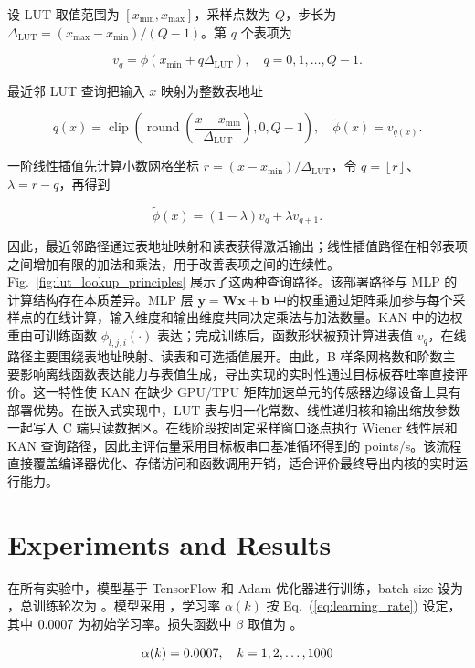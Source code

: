\documentclass[sn-nature]{sn-jnl}
\newif\ifCNENEnglish
\newif\ifCNENBilingual
\newcommand{\CNEN}[2]{%
    \ifCNENBilingual
        #1%
        \if\relax\detokenize{#2}\relax\else\par #2\fi%
    \else
        \ifCNENEnglish
            #2%
        \else
            #1%
        \fi
    \fi
}
\newcommand{\wMAE}{\beta} %
\newcommand{\lr}{\alpha} %
\newcommand{\lridx}{k} %
\begin{document}
\CNEN{设 LUT 取值范围为 $[x_{\min},x_{\max}]$，采样点数为 $Q$，步长为 $\Delta_{\mathrm{LUT}}=(x_{\max}-x_{\min})/(Q-1)$。第 $q$ 个表项为}{}\begin{equation}
    v_q = \phi\left(x_{\min}+q\Delta_{\mathrm{LUT}}\right), \quad q=0,1,\dots,
Q-1.    \label{eq:lut_grid}
\end{equation}
\CNEN{最近邻 LUT 查询把输入 $x$ 映射为整数表地址}{}
\begin{equation}
    q(x)=\operatorname{clip}\left(\operatorname{round}\left(\frac{x-x_{\min}}{
\Delta_{\mathrm{LUT}}}\right),0,Q-1\right), \quad \tilde{\phi}(x)=v_{q(x)}.   
 \label{eq:lut_nearest}\end{equation}
\CNEN{一阶线性插值先计算小数网格坐标 $r=(x-x_{\min})/\Delta_{\mathrm{LUT}}$，令 $q=\left\lfloor r\right\rfloor$、$\lambda=r-q$，再得到}{}\begin{equation}
    \tilde{\phi}(x)=(1-\lambda)v_q+\lambda v_{q+1}.
    \label{eq:lut_interp}
\end{equation}
\CNEN{因此，最近邻路径通过表地址映射和读表获得激活输出；线性插值路径在相邻表项之间增加有限的加法和乘法，用于改善表项之间的连续性。Fig.~\ref{fig:lut_lookup_principles} 展示了这两种查询路径。该部署路径与 MLP 的计算结构存在本质差异。MLP 层 $\mathbf{y}=\mathbf{W}\mathbf{x}+\mathbf{b}$ 中的权重通过矩阵乘加参与每个采样点的在线计算，输入维度和输出维度共同决定乘法与加法数量。KAN 中的边权重由可训练函数 $\phi_{l,j,i}(\cdot)$ 表达；完成训练后，函数形状被预计算进表值 $v_q$，在线路径主要围绕表地址映射、读表和可选插值展开。由此，B 样条网格数和阶数主要影响离线函数表达能力与表值生成，导出实现的实时性通过目标板吞吐率直接评价。这一特性使 KAN 在缺少 GPU/TPU 矩阵加速单元的传感器边缘设备上具有部署优势。在嵌入式实现中，LUT 表与归一化常数、线性递归核和输出缩放参数一起写入 C 端只读数据区。在线阶段按固定采样窗口逐点执行 Wiener 线性层和 KAN 查询路径，因此主评估量采用目标板串口基准循环得到的 points/s。该流程直接覆盖编译器优化、存储访问和函数调用开销，适合评价最终导出内核的实时运行能力。}{}\FloatBarrier



\section{Experiments and Results}

\CNEN{在所有实验中，模型基于 TensorFlow 和 Adam 优化器进行训练，batch size 设为 \valBatchSize，总训练轮次为 \valEpochs。模型采用 \valLearningRateSchedule{}，学习率 $\lr(\lridx)$ 按 Eq.~(\ref{eq:learning_rate}) 设定，其中 $0.0007$ 为初始学习率。损失函数中 $\wMAE$ 取值为 \valMaeWeight。}{}\begin{equation}
    \lr(\lridx) = \valInitLR, \quad \lridx = 1, 2, \dots, \valEpochs
    \label{eq:learning_rate}
\end{equation}
\end{document}
